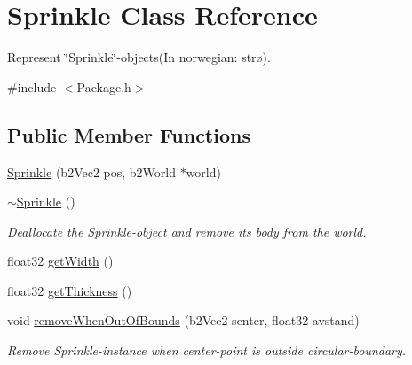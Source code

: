 \hypertarget{classSprinkle}{\section{Sprinkle Class Reference}
\label{classSprinkle}
}


Represent \char`\"{}\-Sprinkle\char`\"{}-\/objects(In norwegian\-: strø).  




{\ttfamily \#include $<$Package.\-h$>$}

\subsection*{Public Member Functions}
\begin{DoxyCompactItemize}
\item 
\hyperlink{classSprinkle_ad8a4a784357965f603134bd4a068d633}{Sprinkle} (b2\-Vec2 pos, b2\-World $\ast$world)
\item 
\hyperlink{classSprinkle_a32800ac4fe6b3f41b5f68c39f1dae3ae}{$\sim$\-Sprinkle} ()
\begin{DoxyCompactList}\small\item\em Deallocate the Sprinkle-\/object and remove its body from the world. \end{DoxyCompactList}\item 
float32 \hyperlink{classSprinkle_aabea3b25464f33b4535077337aa5be4d}{get\-Width} ()
\item 
float32 \hyperlink{classSprinkle_ad3bdbdb77c6bef2f46779788abede0c5}{get\-Thickness} ()
\item 
void \hyperlink{classSprinkle_abf969079337b201692236945d5a6abe9}{remove\-When\-Out\-Of\-Bounds} (b2\-Vec2 senter, float32 avstand)
\begin{DoxyCompactList}\small\item\em Remove Sprinkle-\/instance when center-\/point is outside circular-\/boundary. \end{DoxyCompactList}\end{DoxyCompactItemize}
